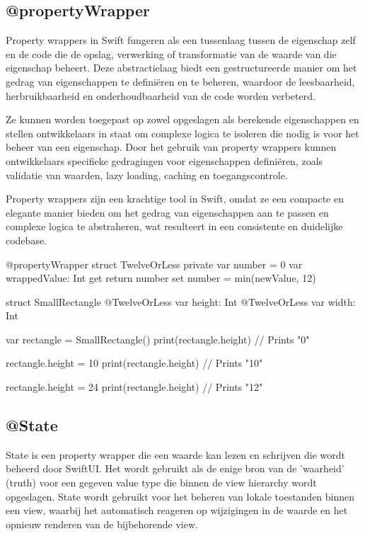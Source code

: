 \subsection{@propertyWrapper}
\autocite{ApplePropertyWrapper} Property wrappers in Swift fungeren als een tussenlaag tussen de eigenschap zelf en de code die de opslag, verwerking of transformatie van de waarde van die eigenschap beheert. Deze abstractielaag biedt een gestructureerde manier om het gedrag van eigenschappen te definiëren en te beheren, waardoor de leesbaarheid, herbruikbaarheid en onderhoudbaarheid van de code worden verbeterd.

Ze kunnen worden toegepast op zowel opgeslagen als berekende eigenschappen en stellen ontwikkelaars in staat om complexe logica te isoleren die nodig is voor het beheer van een eigenschap. Door het gebruik van property wrappers kunnen ontwikkelaars specifieke gedragingen voor eigenschappen definiëren, zoals validatie van waarden, lazy loading, caching en toegangscontrole.

Property wrappers zijn een krachtige tool in Swift, omdat ze een compacte en elegante manier bieden om het gedrag van eigenschappen aan te passen en complexe logica te abstraheren, wat resulteert in een consistente en duidelijke codebase.
\begin{swift}[caption=Example property wrapper code \autocite{PropertyWrapperExample}, label=property_wrapper_example]
    @propertyWrapper
    struct TwelveOrLess {
        private var number = 0
        var wrappedValue: Int {
            get { return number }
            set { number = min(newValue, 12) }
        }
    }
    
    struct SmallRectangle {
        @TwelveOrLess var height: Int
        @TwelveOrLess var width: Int
    }
    
    
    var rectangle = SmallRectangle()
    print(rectangle.height)
    // Prints "0"
    
    
    rectangle.height = 10
    print(rectangle.height)
    // Prints "10"
    
    
    rectangle.height = 24
    print(rectangle.height)
    // Prints "12"
\end{swift}


\subsection{@State}
\autocite{AppleState} State is een property wrapper die een waarde kan lezen en schrijven die wordt beheerd door SwiftUI. Het wordt gebruikt als de enige bron van de 'waarheid' (truth) voor een gegeven value type die binnen de view hierarchy wordt opgeslagen. State wordt gebruikt voor het beheren van lokale toestanden binnen een view, waarbij het automatisch reageren op wijzigingen in de waarde en het opnieuw renderen van de bijbehorende view.

